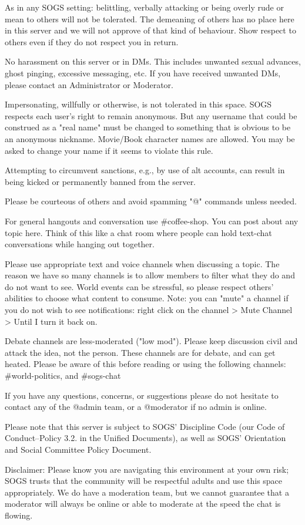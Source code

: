\begin{longenum}[ label*=\thesubsection.\arabic*., align=left]
\begin{longenum}[label*=\arabic*., align=left]
	\item As in any SOGS setting: belittling, verbally attacking or being overly rude or mean to others will not be tolerated. The demeaning of others has no place here in this server and we will not approve of that kind of behaviour. Show respect to others even if they do not respect you in return.
	\item No harassment on this server or in DMs. This includes unwanted sexual advances, ghost pinging, excessive messaging, etc. If you have received unwanted DMs, please contact an Administrator or Moderator.
	\item Impersonating, willfully or otherwise, is not tolerated in this space. SOGS respects each user's right to remain anonymous. But any username that could be construed as a "real name" must be changed to something that is obvious to be an anonymous nickname. Movie/Book character names are allowed. You may be asked to change your name if it seems to violate this rule.
	\item Attempting to circumvent sanctions, e.g., by use of alt accounts, can result in being kicked or permanently banned from the server.
	\item  Please be courteous of others and avoid spamming "@" commands unless needed.
	\item For general hangouts and conversation use \#coffee-shop. You can post about any topic here. Think of this like a chat room where people can hold text-chat conversations while hanging out together.
	\item Please use appropriate text and voice channels when discussing a topic. The reason we have so many channels is to allow members to filter what they do and do not want to see. World events can be stressful, so please respect others' abilities to choose what content to consume. Note: you can "mute" a channel if you do not wish to see notifications: right click on the channel > Mute Channel > Until I turn it back on.
	\item Debate channels are less-moderated ("low mod"). Please keep discussion civil and attack the idea, not the person. These channels are for debate, and can get heated. Please be aware of this before reading or using the following channels: \#world-politics, and \#sogs-chat
	\item If you have any questions, concerns, or suggestions please do not hesitate to contact any of the @admin team, or a @moderator if no admin is online.
	\item Please note that this server is subject to SOGS' Discipline Code (our Code of Conduct--Policy 3.2. in the Unified Documents), as well as SOGS' Orientation and Social Committee Policy Document.
	\item Disclaimer: Please know you are navigating this environment at your own risk; SOGS trusts that the community will be respectful adults and use this space appropriately. We do have a moderation team, but we cannot guarantee that a moderator will always be online or able to moderate at the speed the chat is flowing.
	\end{longenum}
\end{longenum}
